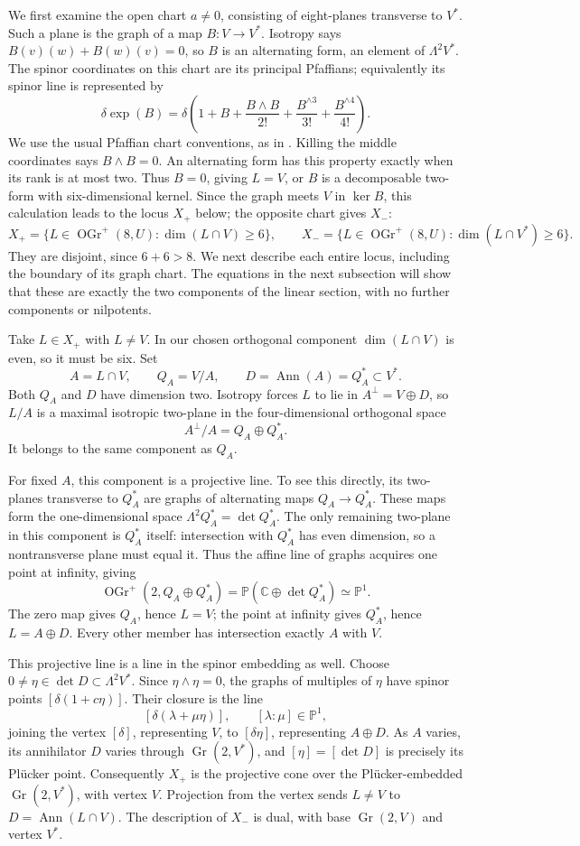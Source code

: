\documentclass[11pt]{article}
\newcommand{\C}{\mathbb C}
\newcommand{\PP}{\mathbb P}
\newcommand{\Gr}{\operatorname{Gr}}
\newcommand{\OGr}{\operatorname{OGr}}
\theoremstyle{definition}
\numberwithin{equation}{section}
\begin{document}
We first examine the open chart $a\ne0$, consisting of eight-planes
transverse to $V^*$. Such a plane is the graph of a map
$B:V\to V^*$. Isotropy says
$B(v)(w)+B(w)(v)=0$, so $B$ is an alternating form, an element of
$\Lambda^2V^*$. The spinor coordinates on this chart are its
principal Pfaffians; equivalently its spinor line is represented by
\[
 \delta\exp(B)=\delta\left(1+B+\frac{B\wedge B}{2!}
                  +\frac{B^{\wedge3}}{3!}+\frac{B^{\wedge4}}{4!}\right).
\]
We use the usual Pfaffian chart conventions, as in
\cite[Section~2]{Rincon}. Killing the middle coordinates says
$B\wedge B=0$. An alternating form has this property exactly when
its rank is at most two. Thus $B=0$, giving $L=V$, or $B$ is
a decomposable two-form with six-dimensional kernel. Since the graph
meets $V$ in $\ker B$, this calculation leads to the locus $X_+$
below; the opposite chart gives $X_-$:
\[
 X_+=\{L\in\OGr^+(8,U):\dim(L\cap V)\geq6\},\qquad
 X_-=\{L\in\OGr^+(8,U):\dim(L\cap V^*)\geq6\}.
\]
They are disjoint, since $6+6>8$. We next describe each entire locus,
including the boundary of its graph chart. The equations in the next
subsection will show that these are exactly the two components of
the linear section, with no further components or nilpotents.

Take $L\in X_+$ with $L\ne V$. In our chosen orthogonal component
$\dim(L\cap V)$ is even, so it must be six. Set
\[
 A=L\cap V,\qquad Q_A=V/A,\qquad
 D=\operatorname{Ann}(A)=Q_A^*\subset V^*.
\]
Both $Q_A$ and $D$ have dimension two. Isotropy forces $L$ to lie
in $A^\perp=V\oplus D$, so $L/A$ is a maximal isotropic two-plane
in the four-dimensional orthogonal space
\[
 A^\perp/A=Q_A\oplus Q_A^*.
\]
It belongs to the same component as $Q_A$.

For fixed $A$, this component is a projective line. To see this
directly, its two-planes transverse to $Q_A^*$ are graphs of alternating
maps $Q_A\to Q_A^*$. These maps form the one-dimensional space
$\Lambda^2Q_A^*=\det Q_A^*$. The only remaining two-plane in
this component is $Q_A^*$ itself: intersection with $Q_A^*$ has
even dimension, so a nontransverse plane must equal it.
Thus the affine line of graphs acquires one point at infinity, giving
\[
 \OGr^+(2,Q_A\oplus Q_A^*)
        =\PP(\C\oplus\det Q_A^*)\simeq\PP^1.
\]
The zero map gives $Q_A$, hence $L=V$; the point at infinity gives
$Q_A^*$, hence $L=A\oplus D$. Every other member has intersection
exactly $A$ with $V$.

This projective line is a line in the spinor embedding as well.
Choose $0\ne\eta\in\det D\subset\Lambda^2V^*$.
Since $\eta\wedge\eta=0$, the graphs of multiples of $\eta$
have spinor points $[\delta(1+c\eta)]$. Their closure is the line
\[
 [\delta(\lambda+\mu\eta)],\qquad[\lambda:\mu]\in\PP^1,
\]
joining the vertex $[\delta]$, representing $V$, to
$[\delta\eta]$, representing $A\oplus D$. As $A$ varies, its
annihilator $D$ varies through $\Gr(2,V^*)$, and $[\eta]=[\det D]$
is precisely its Pl\"ucker point. Consequently $X_+$ is the
projective cone over the Pl\"ucker-embedded $\Gr(2,V^*)$, with
vertex $V$. Projection from the vertex sends $L\ne V$ to
$D=\operatorname{Ann}(L\cap V)$. The description of $X_-$ is
dual, with base $\Gr(2,V)$ and vertex $V^*$.
\end{document}
